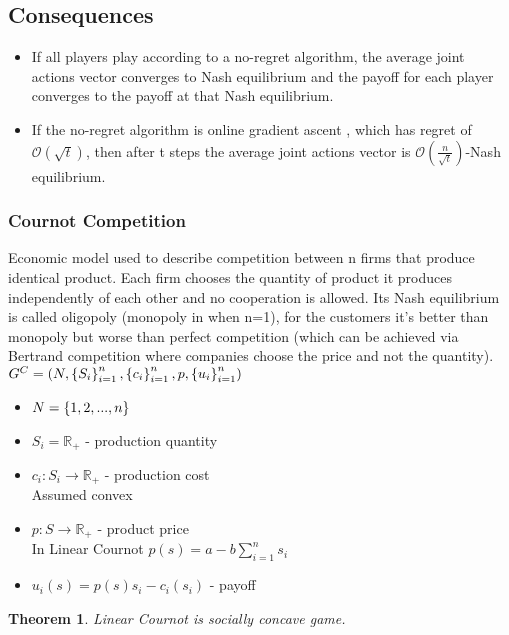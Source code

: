 \documentclass[11pt]{article}
\newtheorem{theorem}{Theorem}[section]
\theoremstyle{definition}
\theoremstyle{definition}
\begin{document}
\subsection{Consequences}
\begin{itemize}
	\item
		If all players play according to a no-regret algorithm, the average joint actions vector converges to Nash equilibrium and the payoff for each player converges to the payoff at that Nash equilibrium.

	\item
		If the no-regret algorithm is online gradient ascent \cite{infi}, which has regret of $\mathcal{O}(\sqrt{t})$, then after t steps the average joint actions vector is $\mathcal{O}(\frac{n}{\sqrt{t}})$-Nash equilibrium.
\end{itemize}


\subsubsection{Cournot Competition}
Economic model used to describe competition between n firms that produce identical product. Each firm chooses the quantity of product it produces independently of each other and no cooperation is allowed. Its Nash equilibrium is called oligopoly (monopoly in when n=1), for the customers it's better than monopoly but worse than perfect competition (which can be achieved via Bertrand competition where companies choose the price and not the quantity).\\


$G^C = \left( N, \left\{ S_i \right\}_{i=1}^{n}, \left\{ c_i \right\}_{i=1}^{n}, p, \left\{ u_i \right\}_{i=1}^{n} \right)$
\begin{itemize}
	\item
		$N = \left\{ 1,2,...,n \right\}$
	\item
		$S_i = \mathbb{R}_+$ - production quantity
	\item
		$c_i: S_i \rightarrow \mathbb{R}_+$ - production cost\\
		Assumed convex
	\item
		$p: S \rightarrow \mathbb{R}_+$ - product price\\
		In Linear Cournot $p(s) = a - b \sum_{i = 1}^n s_i$
	\item
		$u_i(s) = p(s) s_i - c_i(s_i)$ - payoff
\end{itemize}

\def\si{\sum_{i=1}^n}


\begin{theorem}\label{cour}
	Linear Cournot is socially concave game.
\end{theorem}
\end{document}
